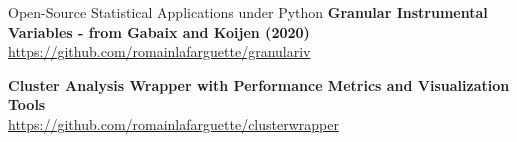 \documentclass[usegeometry, 10pt, a4paper]{cv} %
\newcommand{\activite}[1]{\textbf{#1}\ }
\begin{document}
\begin{rubriquetableau}[0.95\textwidth]{Open-Source Statistical Applications under Python}
\small
\activite{Granular Instrumental Variables - from Gabaix and Koijen (2020)} \\
\hspace{0.6cm} \small{\url{https://github.com/romainlafarguette/granulariv}}
\vspace{0.4cm} 

\small
\activite{Cluster Analysis Wrapper with Performance Metrics and Visualization Tools} \\
\hspace{0.6cm} \small{\url{https://github.com/romainlafarguette/clusterwrapper}}
\vspace{0.4cm} 

\end{rubriquetableau}


\end{document}
